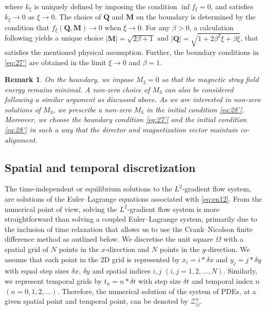 \documentclass{article}
\newtheorem{remark}[theorem]{Remark}
\def\Qvec{\mathbf{Q}}
\def \Mvec{\mathbf{M}}
\begin{document}
where $k_{\xi}$ is uniquely defined by imposing the condition $\inf f_{\xi}=0$, and satisfies $k_{\xi}\rightarrow 0$ as $\xi\rightarrow 0$. The choice of $\Qvec$ and $\Mvec$ on the boundary is determined by the condition that $f_{\xi}(\Qvec, \Mvec)\rightarrow 0$ when $\xi\rightarrow 0$. 
For any $\beta>0$, a calculation following \cite[Appendix~B]{Canevari} yields a unique choice $|\Mvec|=\sqrt{2\beta+1}$ and $|\Qvec|=\sqrt{1+2\beta^2\xi+\beta\xi}$, that satisfies the mentioned physical assumption. Further, the boundary conditions in \eqref{eq:27'} are obtained in the limit $\xi\rightarrow 0$ and $\beta=1$.
\begin{remark}
On the boundary, we impose $M_3=0$ so that the magnetic stray field energy remains minimal. A non-zero choice of $M_3$ can also be considered following a similar argument as discussed above. As we are interested in non-zero solutions of $M_3$, we prescribe a non-zero $M_3$ in the initial condition \eqref{eq:28'}. Moreover, we choose the boundary condition \eqref{eq:27'} and the initial condition \eqref{eq:28'} in such a way that the director and magnetization vector maintain co-alignment. \newline
\end{remark}
\subsection{Spatial and temporal discretization}
The time-independent or equilibrium solutions to the $L^2$-gradient flow system, are solutions of the Euler--Lagrange equations associated with \eqref{eq:en12}. From the numerical point of view, solving the $L^2$-gradient flow system is more straightforward than solving a coupled Euler--Lagrange system, primarily due to the inclusion of time relaxation that allows us to use the Crank--Nicolson finite difference method \cite{Burden-Faires, smith1985numerical} as outlined below.
We discretise the unit square $\Omega$ with a spatial grid of $N$ points in the $x$-direction and $N$ points in the $y$-direction. We assume that each point in the 2D grid is represented by $x_i=i*\delta x$ and $y_j=j*\delta y$ with equal step sizes $\delta x$, $\delta y$ and spatial indices $i,j$ $(i,j=1,2,\ldots, N)$. Similarly, we represent temporal grids by $t_n=n*\delta t$ with step size $\delta t$ and temporal index $n$ $(n=0,1,2,\ldots )$. Therefore, the numerical solution of the system of PDEs, at a given spatial point and temporal point, can be denoted by $\mathcal{Z}^n_{ij}$.
\end{document}
